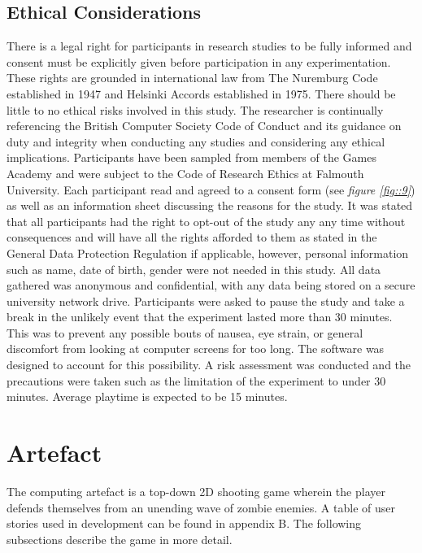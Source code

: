 \documentclass[journal]{IEEEtran}
\begin{document}
\subsection{Ethical Considerations}
There is a legal right for participants in research studies to be fully informed and consent must be explicitly given before participation in any experimentation. These rights are grounded in international law from The Nuremburg Code established in 1947 and Helsinki Accords established in 1975. There should be little to no ethical risks involved in this study. The researcher is continually referencing the British Computer Society Code of Conduct \cite{bcs} and its guidance on duty and integrity when conducting any studies and considering any ethical implications. Participants have been sampled from members of the Games Academy and were subject to the Code of Research Ethics at Falmouth University. Each participant read and agreed to a consent form (see \textit{figure \ref{fig::9}}) as well as an information sheet discussing the reasons for the study. It was stated that all participants had the right to opt-out of the study any any time without consequences and will have all the rights afforded to them as stated in the General Data Protection Regulation \cite{gdpr} if applicable, however, personal information such as name, date of birth, gender were not needed in this study. All data gathered was anonymous and confidential, with any data being stored on a secure university network drive. Participants were asked to pause the study and take a break in the unlikely event that the experiment lasted more than 30 minutes. This was to prevent any possible bouts of nausea, eye strain, or general discomfort from looking at computer screens for too long. The software was designed to account for this possibility. A risk assessment was conducted and the precautions were taken such as the limitation of the experiment to under 30 minutes. Average playtime is expected to be 15 minutes.



\section{Artefact}
The computing artefact is a top-down 2D shooting game wherein the player defends themselves from an unending wave of zombie enemies. A table of user stories used in development can be found in appendix B. The following subsections describe the game in more detail.
\end{document}
